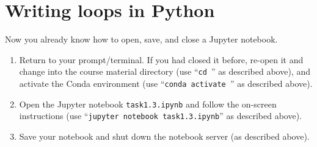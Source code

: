 \documentclass[12pt,a4paper]{article}
\begin{document}
\section{Writing loops in Python}
Now you already know how to open, save, and close a Jupyter notebook.
\begin{enumerate}
    \item Return to your prompt/terminal. If you had closed it before, re-open it and change into the course material directory (use ``\texttt{cd {\projectid}}'' as described above), and activate the Conda environment (use ``\texttt{conda activate {\projectid}}'' as described above).
    \item Open the Jupyter notebook \texttt{task1.3.ipynb} and follow the on-screen instructions (use ``\texttt{jupyter notebook task1.3.ipynb}'' as described above).
    \item Save your notebook and shut down the notebook server (as described above).
\end{enumerate}
\end{document}
